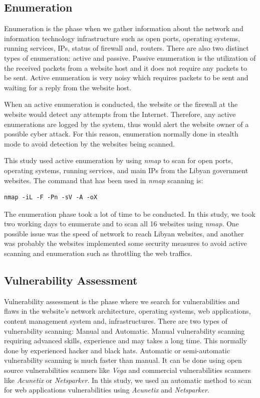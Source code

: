 \documentclass[conference]{IEEEtran}
\begin{document}
\subsection{Enumeration}

Enumeration is the phase when we gather information about the
network and information technology infrastructure such as open ports, operating systems,
running services, IPs, status of firewall and, routers\cite{mehta2018penetration}. There are also two distinct types
of enumeration: active and passive. Passive enumeration is the
utilization of the received packets from a website
host and it does not require any packets to be sent.
Active enumeration is very noisy which requires
packets to be sent and waiting for a reply from the
website host.

When an active enumeration is conducted, the website or the firewall at the website would detect any attempts from the Internet. Therefore, any active enumerations are logged by the system, thus would alert the website owner of a possible cyber attack. For this reason, enumeration normally done in stealth mode to avoid detection by the websites being scanned.

This study used active enumeration by
using \emph{nmap}\cite{ lyon2009nmap} to scan for open
ports, operating systems, running services, and main IPs from the Libyan government websites. The command that has
been used in \emph{nmap} scanning is:

\begin{verbatim}
nmap -iL -F -Pn -sV -A -oX
\end{verbatim}

The enumeration phase took a lot of time to be conducted. In this study, we took two working days to enumerate and to scan all 16 websites using \emph{nmap}. One possible issue was the speed of network to reach Libyan websites, and another was probably the websites implemented some security measures to avoid active scanning and enumeration such as throttling the web traffics.

\subsection{Vulnerability Assessment} 

Vulnerability assessment\cite{shah2015overview} is 
the phase where we search for
vulnerabilities and flaws in the website’s network architecture,
operating systems, web applications, content management system and, infrastructures. There are two types
of vulnerability scanning: Manual and Automatic.
Manual vulnerability scanning requiring advanced
skills, experience and may takes a long time. This normally done by experienced hacker and black hats\cite{mahmood2010moving}\cite{idris2017vulnerability}.
Automatic or semi-automatic vulnerability scanning
is much faster than manual. It can be done using
open source vulnerabilities scanners like \emph{Vega} and commercial vulnerabilities scanners like \emph{Acunetix} or \emph{Netsparker}.
In this study, we used an
automatic method to scan for web applications
vulnerabilities using \emph{Acunetix} and \emph{Netsparker}.
\end{document}
